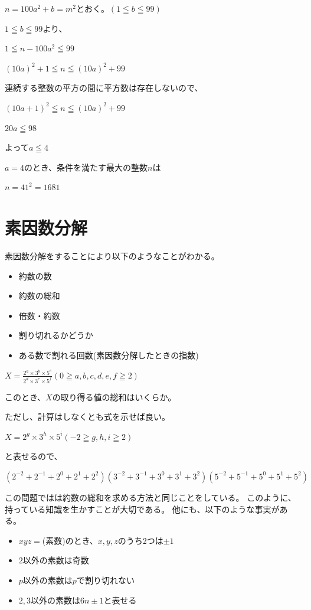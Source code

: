 \documentclass[uplatex,dvipdfmx]{jsbook}
\begin{document}
\begin{answer}[別解]
    $n=100a^2+b=m^2$とおく。$\left(1\leqq b \leqq 99\right)$

    $1\leqq b \leqq 99$より、

    $1\leqq n-100a^2 \leqq 99$

    $\left(10a\right)^2+1 \leqq n \leqq \left(10a\right)^2+99$

    連続する整数の平方の間に平方数は存在しないので、

    $\left(10a+1\right)^2 \leqq n \leqq \left(10a\right)^2+99$

    $20a \leqq 98$

    よって$a\leqq 4$

    $a=4$のとき、条件を満たす最大の整数$n$は

    $n=41^2=1681$
\end{answer}

\section{素因数分解}
素因数分解をすることにより以下のようなことがわかる。
\begin{itemize}
    \item 約数の数
    \item 約数の総和
    \item 倍数・約数
    \item 割り切れるかどうか
    \item ある数で割れる回数(素因数分解したときの指数)
\end{itemize}

\begin{problem}[練習問題]
    $\displaystyle X=\frac{2^a\times 3^b \times 5^c}{2^d\times 3^e \times 5^f}\left(0\geqq a,b,c,d,e,f\geqq 2\right)$

    このとき、$X$の取り得る値の総和はいくらか。

    ただし、計算はしなくとも式を示せば良い。
\end{problem}

\begin{answer}
    $\displaystyle X=2^g\times 3^h \times 5^i\left(-2\geqq g,h,i\geqq 2\right)$

    と表せるので、

    $\left(2^{-2}+2^{-1}+2^{0}+2^{1}+2^{2}\right)\left(3^{-2}+3^{-1}+3^{0}+3^{1}+3^{2}\right)\left(5^{-2}+5^{-1}+5^{0}+5^{1}+5^{2}\right)$
\end{answer}

この問題ではは約数の総和を求める方法と同じことをしている。
このように、持っている知識を生かすことが大切である。
他にも、以下のような事実がある。
\begin{itemize}
    \item $xyz=$(素数)のとき、$x,y,z$のうち2つは$\pm 1$
    \item $2$以外の素数は奇数
    \item $p$以外の素数は$p$で割り切れない
    \item $2,3$以外の素数は$6n\pm 1$と表せる
\end{itemize}
\end{document}
